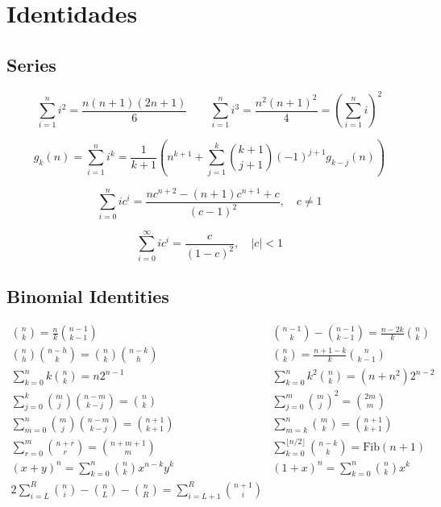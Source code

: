 \section{Identidades}

\subsection{Series}

$$\sum_{i=1}^{n} i^{2} = \frac{n(n+1)(2n+1)}{6}  \qquad  \sum_{i=1}^{n} i^{3} = \frac{n^{2}(n+1)^{2}}{4} = \left(\sum_{i=1}^n i\right)^2$$

$$ g_k(n) = \sum_{i=1}^n i^k = \frac{1}{k+1} \left( n^{k+1} + \sum_{j=1}^k \binom{k+1}{j+1} (-1)^{j+1} g_{k-j}(n) \right) $$

$$\sum_{i=0}^{n} ic^{i} = \frac{nc^{n+2} - (n+1)c^{n+1} + c}{(c-1)^{2}}, \quad c \neq 1$$

$$\sum_{i=0}^{\infty} ic^{i} = \frac{c}{(1-c)^{2}}, \quad |c| < 1$$

\subsection{Binomial Identities}

\bigskip

$$
\begin{array}{cc}
\binom{n}{k} = \frac{n}{k}\binom{n-1}{k-1}
&
\binom{n-1}{k} - \binom{n-1}{k-1} = \frac{n - 2k}{k} \binom{n}{k}
\\[10pt]
\binom{n}{h}\binom{n-h}{k} = \binom{n}{k}\binom{n-k}{h} &
\binom{n}{k} = \frac{n+1-k}{k} \binom{n}{k-1}
\\[10pt]
\sum_{k = 0}^n k\binom{n}{k} = n 2^{n-1} &
\sum_{k = 0}^n k^2 \binom{n}{k} = (n + n^2)2^{n-2}
\\[10pt]
\sum_{j = 0}^k\binom{m}{j} \binom{n-m}{k-j} = \binom{n}{k} &
\sum_{j = 0}^m \binom{m}{j}^2 = \binom{2m}{m}
\\[10pt]
\sum_{m = 0}^n \binom{m}{j} \binom{n-m}{k-j} = \binom{n+1}{k+1} &
\sum_{m = k}^n \binom{m}{k} = \binom{n+1}{k+1}
\\[10pt]
\sum_{r = 0}^m \binom{n+r}{r} = \binom{n+m+1}{m} &
\sum_{k=0}^{\lfloor n/2 \rfloor} \binom{n-k}{k} = \text{Fib}(n+1)
\\[10pt]
(x + y)^{n} = \sum_{k=0}^{n} \binom{n}{k} x^{n-k} y^{k} &
(1 + x)^{n} = \sum_{k=0}^{n} \binom{n}{k} x^{k}
\\[10pt]
2\sum_{i = L}^R \binom{n}{i} - \binom{n}{L} - \binom{n}{R} = \sum_{i = L+1}^R \binom{n+1}{i}
\end{array}
$$
